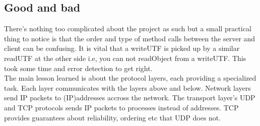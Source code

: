 \subsection{Good and bad}
\label{tcp_conclusion}

There’s nothing too complicated about the project as such but a small practical thing to notice is that the order and type of method calls between the server and client can be confusing. It is vital that a writeUTF is picked up by a similar readUTF at the other side i.e, you can not readObject from a writeUTF. This took some time and error detection to get right.\\ 

The main lesson learned is about the protocol layers, each providing a specialized task. Each layer communicates with the layers above and below. 
Network layers send IP packets to (IP)addresses accross the network. The transport layer's UDP and TCP protocols sends IP packets to processes instead of addresses. TCP provides guarantees about reliability, ordering etc that UDP does not.


